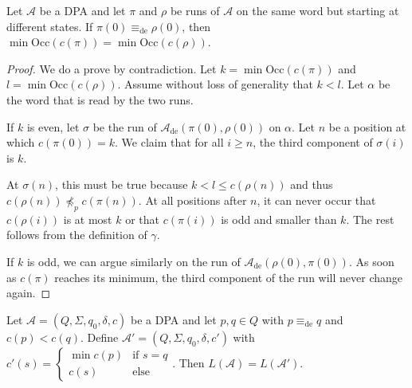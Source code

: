 \begin{lem}
\label{lem:fritzwilke:equiv_states_same_minpri}
	Let $\mathcal{A}$ be a DPA and let $\pi$ and $\rho$ be runs of $\mathcal{A}$ on the same word but starting at different states. If $\pi(0) \equiv_\text{de} \rho(0)$, then $\min \text{Occ}(c(\pi)) = \min \text{Occ}(c(\rho))$.
\end{lem}

\begin{proof}
	We do a prove by contradiction. Let $k = \min \text{Occ}(c(\pi))$ and $l = \min \text{Occ}(c(\rho))$. Assume without loss of generality that $k < l$. Let $\alpha$ be the word that is read by the two runs.
	
	If $k$ is even, let $\sigma$ be the run of $\mathcal{A}_\text{de}(\pi(0), \rho(0))$ on $\alpha$. Let $n$ be a position at which $c(\pi(0)) = k$. We claim that for all $i \geq n$, the third component of $\sigma(i)$ is $k$.
	
	At $\sigma(n)$, this must be true because $k < l \leq c(\rho(n))$ and thus $c(\rho(n)) \not\preceq_p c(\pi(n))$. At all positions after $n$, it can never occur that $c(\rho(i))$ is at most $k$ or that $c(\pi(i))$ is odd and smaller than $k$. The rest follows from the definition of $\gamma$.
	
	If $k$ is odd, we can argue similarly on the run of $\mathcal{A}_\text{de}(\rho(0), \pi(0))$. As soon as $c(\pi)$ reaches its minimum, the third component of the run will never change again.
\end{proof}

\begin{theorem}
	Let $\mathcal{A} = (Q, \Sigma, q_0, \delta, c)$ be a DPA and let $p, q \in Q$ with $p \equiv_\text{de} q$ and $c(p) < c(q)$. Define $\mathcal{A}' = (Q, \Sigma, q_0, \delta, c')$ with $c'(s) = \begin{cases} \min c(p) & \text{if } s = q \\ c(s) & \text{else} \end{cases}$. Then $L(\mathcal{A}) = L(\mathcal{A}')$.
\end{theorem}

